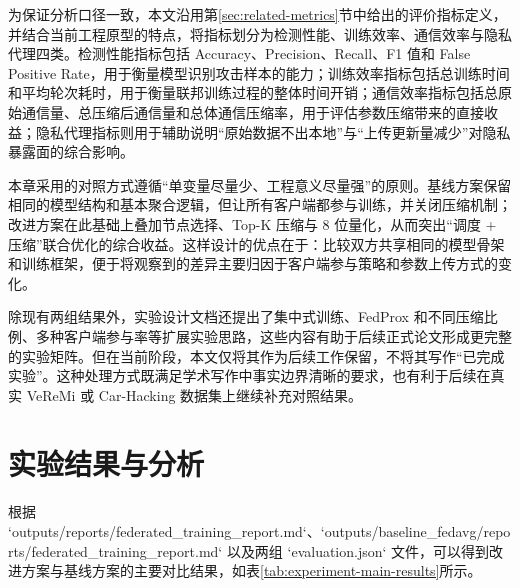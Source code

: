 为保证分析口径一致，本文沿用第\ref{sec:related-metrics}节中给出的评价指标定义，并结合当前工程原型的特点，将指标划分为检测性能、训练效率、通信效率与隐私代理四类。检测性能指标包括 Accuracy、Precision、Recall、F1 值和 False Positive Rate，用于衡量模型识别攻击样本的能力；训练效率指标包括总训练时间和平均轮次耗时，用于衡量联邦训练过程的整体时间开销；通信效率指标包括总原始通信量、总压缩后通信量和总体通信压缩率，用于评估参数压缩带来的直接收益；隐私代理指标则用于辅助说明“原始数据不出本地”与“上传更新量减少”对隐私暴露面的综合影响。

本章采用的对照方式遵循“单变量尽量少、工程意义尽量强”的原则。基线方案保留相同的模型结构和基本聚合逻辑，但让所有客户端都参与训练，并关闭压缩机制；改进方案在此基础上叠加节点选择、Top-K 压缩与 8 位量化，从而突出“调度 + 压缩”联合优化的综合收益。这样设计的优点在于：比较双方共享相同的模型骨架和训练框架，便于将观察到的差异主要归因于客户端参与策略和参数上传方式的变化。

除现有两组结果外，实验设计文档还提出了集中式训练、FedProx 和不同压缩比例、多种客户端参与率等扩展实验思路，这些内容有助于后续正式论文形成更完整的实验矩阵。但在当前阶段，本文仅将其作为后续工作保留，不将其写作“已完成实验”。这种处理方式既满足学术写作中事实边界清晰的要求，也有利于后续在真实 VeReMi 或 Car-Hacking 数据集上继续补充对照结果。

\section{实验结果与分析}
\label{sec:experiment-results}

根据 `outputs/reports/federated\_training\_report.md`、`outputs/baseline\_fedavg/reports/federated\_training\_report.md` 以及两组 `evaluation.json` 文件，可以得到改进方案与基线方案的主要对比结果，如表\ref{tab:experiment-main-results}所示。

